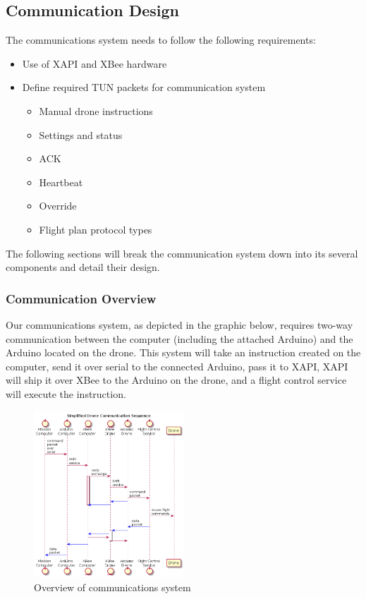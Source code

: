 \subsection{Communication Design}
The communications system needs to follow the following requirements:
\begin{itemize}
	\item Use of XAPI and XBee hardware
	\item Define required TUN packets for communication system 
	\begin{itemize}
		\item Manual drone instructions
		\item Settings and status
		\item ACK
		\item Heartbeat
		\item Override
		\item Flight plan protocol types
	\end{itemize}
\end{itemize}

The following sections will break the communication system down into its several components and detail their design.

	\subsubsection{Communication Overview}
	Our communications system, as depicted in the graphic below, requires two-way communication between the computer (including the attached Arduino) and the Arduino located on the drone. This system will take an instruction created on the computer, send it over serial to the connected Arduino, pass it to XAPI, XAPI will ship it over XBee to the Arduino on the drone, and a flight control service will execute the instruction. 
	
	\begin{figure}[h!]

  		\centering
    	\includegraphics[width=0.5\textwidth]{./plantUML/droneControlSequence.png}
   		\caption{Overview of communications system}
	\end{figure}
	

